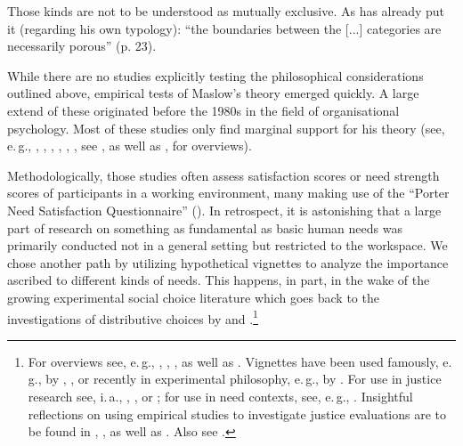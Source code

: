 \documentclass[egregdoesnotlikesansseriftitles]{scrartcl}
\begin{document}
Those kinds are not to be understood as mutually exclusive.
As \cite{hamilton_political_2003} has already put it (regarding his own typology): ``the boundaries between the [...] categories are necessarily porous'' (p. 23).

While there are no studies explicitly testing the philosophical considerations outlined above, empirical tests of Maslow's theory emerged quickly.
A large extend of these originated before the 1980s in the field of organisational psychology.
Most of these studies only find marginal support for his theory (see, e.\,g., \citealt{hall_examination_1968}, \citealt{payne_factor_1970}, \citealt{roberts_factor_1971}, \citealt{lawler_causal_1972}, \citealt{herman_managerial_1973}, \citealt{waters_factor_1973},  see \citealt{wahba_maslow_1976}, as well as \citealt{mitchell_measurement_1976}, for overviews).

Methodologically, those studies often assess satisfaction scores or need strength scores of participants in a working environment, many making use of the ``Porter Need Satisfaction Questionnaire'' (\citealt{porter_study_1961}).
In retrospect, it is astonishing that a large part of research on something as fundamental as basic human needs was primarily conducted not in a general setting but restricted to the workspace.
We chose another path by utilizing hypothetical vignettes to analyze the importance ascribed to different kinds of needs.
This happens, in part, in the wake of the growing experimental social choice literature which goes back to the investigations of distributive choices by \citet{yaari_dividing_1984} and \citet{frohlich_choices_1987}.\footnote{For overviews see, e.\,g., \cite{konow_which_2003}, \cite{traub_friedman_2005}, \cite{konow_is_2009}, as well as \cite{gaertner_empirical_2012}. Vignettes have been used famously, e.\,g., by \cite{dahl_does_1999}, \cite{kahneman_prospect_1979}, or recently in experimental philosophy, e.\,g., by  \cite{knobe_intentional_2003_a,knobe_intentional_2003_b}. For use in justice research see, i.\,a., \cite{kahneman_fairness_1986}, \cite{blinder_shred_1990}, or \cite{levine_fairness_1993}; for use in need contexts, see, e.\,g., \cite{bauer_zur_2019}. Insightful reflections on using empirical studies to investigate justice evaluations are to be found in \cite{miller_distributive_1992}, \cite{elster_empirical_1995}, as well as \cite{levitt_what_2007}. Also see \cite{bauer_philosophie_2019,bauer_empirical_2020}.}
\end{document}
